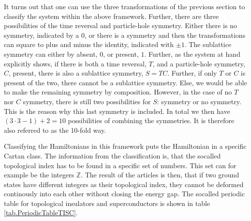 It turns out that one can use the three transformations of the previous section to classify the system within the above framework. Further, there are three possibilities of the time reversal and particle-hole symmetry. Either there is no symmetry, indicated by a $0$, or there is a symmetry and then the transformations can square to plus and minus the identity, indicated with $\pm 1$. The sublattice symmetry can either by absent, $0$, or present, $1$. Further, as the system at hand explicitly shows, if there is both a time reversal, $T$, and a particle-hole symmetry, $C$, present, there is also a sublattice symmetry, $S=TC$. Further, if only $T$ or $C$ is present of the two, there cannot be a sublattice symmetry. Else, we would be able to make the remaining symmetry by composition. However, in the case of no $T$ nor $C$ symmetry, there is still two possibilities for $S$: symmetry or no symmetry. This is the reason why this last symmetry is included. In total we then have $(3\cdot 3 - 1) + 2 = 10$ possibilities of combining the symmetries. It is therefore also referred to as the 10-fold way. 

Classifying the Hamiltonians in this framework puts the Hamiltonian in a specific Cartan class. The information from the classification is, that the socalled topological index has to be found in a specific set of numbers. This set can for example be the integers $\mathbb{Z}$. The result of the articles is then, that if two ground states have different integers as their topological index, they cannot be deformed continously into each other without closing the energy gap. The socalled periodic table for topological insulators and superconductors is shown in table \ref{tab.PeriodicTableTISC}.

